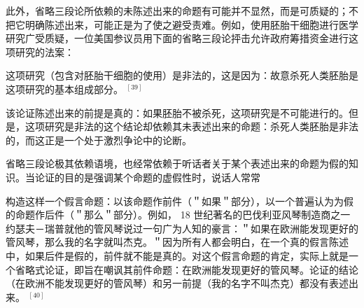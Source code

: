 此外，省略三段论所依赖的未陈述出来的命题有可能并不显然，而是可质疑的；不把它明确陈述出来，可能正是为了使之避受责难。例如，使用胚胎干细胞进行医学研究广受质疑，一位美国参议员用下面的省略三段论抨击允许政府筹措资金进行这项研究的法案：

\begin{displayquote}
这项研究（包含对胚胎干细胞的使用）是非法的，这是因为：故意杀死人类胚胎是这项研究的基本组成部分。 ${ }^{[39]}$
\end{displayquote}

该论证陈述出来的前提是真的：如果胚胎不被杀死，这项研究是不可能进行的。但是，这项研究是非法的这个结论却依赖其未表述出来的命题：杀死人类胚胎是非法的，而这正是一个处于激烈争论中的论断。

省略三段论极其依赖语境，也经常依赖于听话者关于某个表述出来的命题为假的知识。当论证的目的是强调某个命题的虚假性时，说话人常常

构造这样一个假言命题：以该命题作前件（＂如果＂部分），以一个普遍认为为假的命题作后件（＂那么＂部分）。例如， 18 世纪著名的巴伐利亚风琴制造商之一约瑟夫－瑞普就他的管风琴说过一句广为人知的豪言：＂如果在欧洲能发现更好的管风琴，那么我的名字就叫杰克。＂因为所有人都会明白，在一个真的假言陈述中，如果后件是假的，前件就不能是真的。对这个假言命题的肯定，实际上就是一个省略式论证，即旨在嘲讽其前件命题：在欧洲能发现更好的管风琴。论证的结论（在欧洲不能发现更好的管风琴）和另一前提（我的名字不叫杰克）都没有表述出来。 ${ }^{[40]}$ 